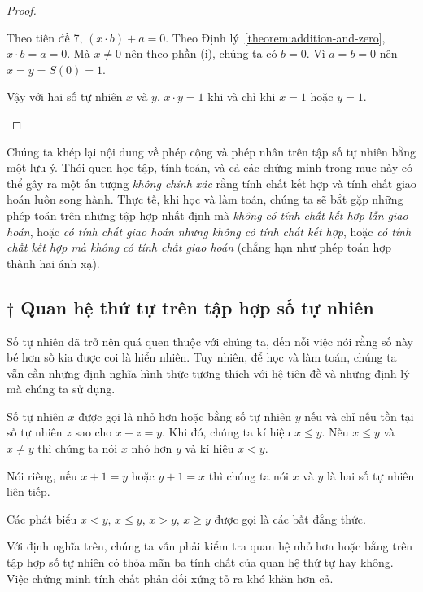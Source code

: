 \begin{proof}
\begin{enumerate}[label={(\roman*)}]
		      Theo tiên đề 7, $(x\cdot b) + a = 0$. Theo Định lý~\ref{theorem:addition-and-zero}, $x\cdot b = a = 0$. Mà $x\ne 0$ nên theo phần (i), chúng ta có $b = 0$. Vì $a = b = 0$ nên $x = y = S(0) = 1$.

		      Vậy với hai số tự nhiên $x$ và $y$, $x\cdot y = 1$ khi và chỉ khi $x = 1$ hoặc $y = 1$.
	\end{enumerate}
\end{proof}

Chúng ta khép lại nội dung về phép cộng và phép nhân trên tập số tự nhiên bằng một lưu ý. Thói quen học tập, tính toán, và cả các chứng minh trong mục này có thể gây ra một ấn tượng \textit{không chính xác} rằng tính chất kết hợp và tính chất giao hoán luôn song hành. Thực tế, khi học và làm toán, chúng ta sẽ bắt gặp những phép toán trên những tập hợp nhất định mà \textit{không có tính chất kết hợp lẫn giao hoán}, hoặc \textit{có tính chất giao hoán nhưng không có tính chất kết hợp}, hoặc \textit{có tính chất kết hợp mà không có tính chất giao hoán} (chẳng hạn như phép toán hợp thành hai ánh xạ).

\subsection*{$\dagger$ Quan hệ thứ tự trên tập hợp số tự nhiên}

Số tự nhiên đã trở nên quá quen thuộc với chúng ta, đến nỗi việc nói rằng số này bé hơn số kia được coi là hiển nhiên. Tuy nhiên, để học và làm toán, chúng ta vẫn cần những định nghĩa hình thức tương thích với hệ tiên đề và những định lý mà chúng ta sử dụng.

\begin{definition}
	Số tự nhiên $x$ được gọi là nhỏ hơn hoặc bằng số tự nhiên $y$ nếu và chỉ nếu tồn tại số tự nhiên $z$ sao cho $x + z = y$. Khi đó, chúng ta kí hiệu $x\leq y$. Nếu $x\leq y$ và $x\ne y$ thì chúng ta nói $x$ nhỏ hơn $y$ và kí hiệu $x < y$.

	Nói riêng, nếu $x + 1 = y$ hoặc $y + 1 = x$ thì chúng ta nói $x$ và $y$ là hai số tự nhiên liên tiếp.
\end{definition}

Các phát biểu $x < y$, $x\leq y$, $x > y$, $x\geq y$ được gọi là các bất đẳng thức.

Với định nghĩa trên, chúng ta vẫn phải kiểm tra quan hệ nhỏ hơn hoặc bằng trên tập hợp số tự nhiên có thỏa mãn ba tính chất của quan hệ thứ tự hay không. Việc chứng minh tính chất phản đối xứng tỏ ra khó khăn hơn cả.

